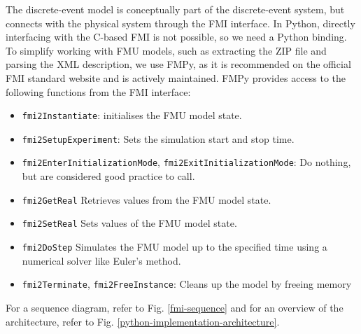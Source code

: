 \documentclass[conference]{IEEEtran}
\begin{document}
The discrete-event model is conceptually part of the discrete-event system,
but connects with the physical system through the FMI interface.
In Python, directly interfacing with the C-based FMI is not possible,
so we need a Python binding.
To simplify working with FMU models, such as extracting the ZIP file and parsing the XML description, we use FMPy,
as it is recommended on the official FMI standard website
and is actively maintained.
FMPy provides access to the following functions from the FMI interface:
\begin{itemize}
    \item \texttt{fmi2Instantiate}: initialises the FMU model state.
    \item \texttt{fmi2SetupExperiment}: Sets the simulation start and stop time.
    \item \texttt{fmi2EnterInitializationMode}, \texttt{fmi2ExitInitializationMode}: Do nothing, but are considered good practice to call.
    \item \texttt{fmi2GetReal} Retrieves values from the FMU model state.
    \item \texttt{fmi2SetReal} Sets values of the FMU model state.
    \item \texttt{fmi2DoStep} Simulates the FMU model up to the specified time using a numerical solver like Euler's method.
    \item \texttt{fmi2Terminate}, \texttt{fmi2FreeInstance}: Cleans up the model by freeing memory 
    
\end{itemize}
For a sequence diagram, refer to Fig. \ref{fmi-sequence} and
for an overview of the architecture, refer to Fig. \ref{python-implementation-architecture}.
\end{document}
